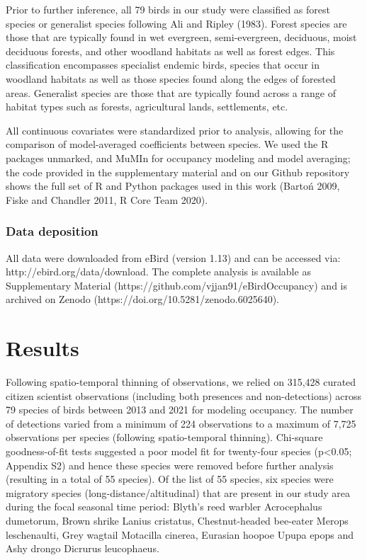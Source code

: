 Prior to further inference, all 79 birds in our study were classified as forest species or generalist species following Ali and Ripley (1983).
Forest species are those that are typically found in wet evergreen, semi-evergreen, deciduous, moist deciduous forests, and other woodland habitats as well as forest edges.
This classification encompasses specialist endemic birds, species that occur in woodland habitats as well as those species found along the edges of forested areas.
Generalist species are those that are typically found across a range of habitat types such as forests, agricultural lands, settlements, etc.

All continuous covariates were standardized prior to analysis, allowing for the comparison of model-averaged coefficients between species.
We used the R packages unmarked, and MuMIn for occupancy modeling and model averaging; the code provided in the supplementary material and on our Github repository shows the full set of R and Python packages used in this work (Bartoń 2009, Fiske and Chandler 2011, R Core Team 2020).

\subsubsection*{Data deposition}

All data were downloaded from eBird (version 1.13) and can be accessed via: http://ebird.org/data/download.
The complete analysis is available as Supplementary Material (https://github.com/vjjan91/eBirdOccupancy) and is archived on Zenodo (https://doi.org/10.5281/zenodo.6025640).

\section*{Results}

Following spatio-temporal thinning of observations, we relied on 315,428 curated citizen scientist observations (including both presences and non-detections) across 79 species of birds between 2013 and 2021 for modeling occupancy.
The number of detections varied from a minimum of 224 observations to a maximum of 7,725 observations per species (following spatio-temporal thinning).
Chi-square goodness-of-fit tests suggested a poor model fit for twenty-four species (p<0.05; Appendix S2) and hence these species were removed before further analysis (resulting in a total of 55 species).
Of the list of 55 species, six species were migratory species (long-distance/altitudinal) that are present in our study area during the focal seasonal time period: Blyth's reed warbler Acrocephalus dumetorum, Brown shrike Lanius cristatus, Chestnut-headed bee-eater Merops leschenaulti, Grey wagtail Motacilla cinerea, Eurasian hoopoe Upupa epops and Ashy drongo Dicrurus leucophaeus.


